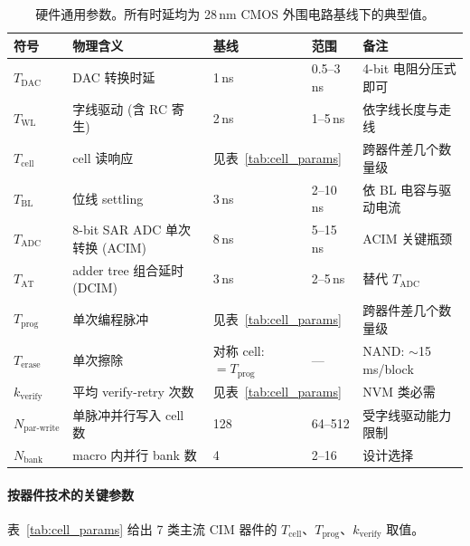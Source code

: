 \begin{table}[h!]
\centering
\small
\renewcommand{\arraystretch}{1.2}
\begin{tabular}{@{} l p{} l l p{} @{}}
\toprule
\textbf{符号} & \textbf{物理含义} & \textbf{基线} & \textbf{范围} & \textbf{备注} \\
\midrule
$T_{\mathrm{DAC}}$ & DAC 转换时延 & 1\,ns & 0.5--3\,ns & 4-bit 电阻分压式即可 \\
$T_{\mathrm{WL}}$ & 字线驱动 (含 RC 寄生) & 2\,ns & 1--5\,ns & 依字线长度与走线 \\
$T_{\mathrm{cell}}$ & cell 读响应 & \multicolumn{2}{l}{见表~\ref{tab:cell_params}} & 跨器件差几个数量级 \\
$T_{\mathrm{BL}}$ & 位线 settling & 3\,ns & 2--10\,ns & 依 BL 电容与驱动电流 \\
$T_{\mathrm{ADC}}$ & 8-bit SAR ADC 单次转换 (ACIM) & 8\,ns & 5--15\,ns & ACIM 关键瓶颈 \\
$T_{\mathrm{AT}}$ & adder tree 组合延时 (DCIM) & 3\,ns & 2--5\,ns & 替代 $T_{\mathrm{ADC}}$ \\
$T_{\mathrm{prog}}$ & 单次编程脉冲 & \multicolumn{2}{l}{见表~\ref{tab:cell_params}} & 跨器件差几个数量级 \\
$T_{\mathrm{erase}}$ & 单次擦除 & 对称 cell: $=T_{\mathrm{prog}}$ & — & NAND: $\sim$15\,ms/block \\
$k_{\mathrm{verify}}$ & 平均 verify-retry 次数 & \multicolumn{2}{l}{见表~\ref{tab:cell_params}} & NVM 类必需 \\
$N_{\mathrm{par\text{-}write}}$ & 单脉冲并行写入 cell 数 & 128 & 64--512 & 受字线驱动能力限制 \\
$N_{\mathrm{bank}}$ & macro 内并行 bank 数 & 4 & 2--16 & 设计选择 \\
\bottomrule
\end{tabular}
\caption{硬件通用参数。所有时延均为 28\,nm CMOS 外围电路基线下的典型值。}
\label{tab:hw_params}
\end{table}

\paragraph{按器件技术的关键参数}
表~\ref{tab:cell_params} 给出 7 类主流 CIM 器件的 $T_{\mathrm{cell}}$、$T_{\mathrm{prog}}$、$k_{\mathrm{verify}}$ 取值。

